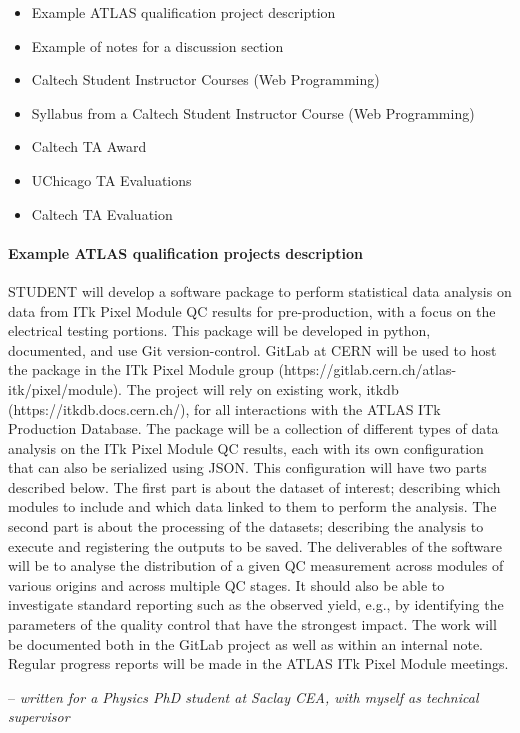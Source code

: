 \begin{itemize}
	\setlength{\itemsep}{0em}
	\item Example ATLAS qualification project description
	\item Example of notes for a discussion section
	\item Caltech Student Instructor Courses (Web Programming)
	\item Syllabus from a Caltech Student Instructor Course (Web Programming)
	\item Caltech TA Award
	\item UChicago TA Evaluations
	\item Caltech TA Evaluation
\end{itemize}

\paragraph{Example ATLAS qualification projects description}
\begin{displayquote}
	{STUDENT} will develop a software package to perform statistical data
	analysis on data from ITk Pixel Module QC results for pre-production, with
	a focus on the electrical testing portions. This package will be developed
	in python, documented, and use Git version-control. GitLab at CERN will be
	used to host the package in the ITk Pixel Module group
	(https://gitlab.cern.ch/atlas-itk/pixel/module). The project will rely on
	existing work, itkdb (https://itkdb.docs.cern.ch/), for all interactions
	with the ATLAS ITk Production Database. The package will be a collection of
	different types of data analysis on the ITk Pixel Module QC results, each
	with its own configuration that can also be serialized using JSON. This
	configuration will have two parts described below. The first part is about
	the dataset of interest; describing which modules to include and which data
	linked to them to perform the analysis. The second part is about the
	processing of the datasets; describing the analysis to execute and
	registering the outputs to be saved. The deliverables of the software will
	be to analyse the distribution of a given QC measurement across modules of
	various origins and across multiple QC stages. It should also be able to
	investigate standard reporting such as the observed yield, e.g., by
	identifying the parameters of the quality control that have the strongest
	impact. The work will be documented both in the GitLab project as well as
	within an internal note. Regular progress reports will be made in the ATLAS
	ITk Pixel Module meetings.
\end{displayquote}
-- \textit{written for a Physics PhD student at Saclay CEA, with myself as technical supervisor}

